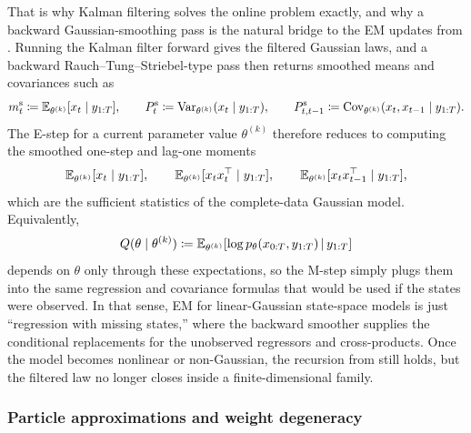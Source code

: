 That is why Kalman filtering solves the online problem exactly, and why a backward Gaussian-smoothing pass is the natural bridge to the EM updates from .
Running the Kalman filter forward gives the filtered Gaussian laws, and a backward Rauch--Tung--Striebel-type pass then returns smoothed means and covariances such as
\[
  m_t^{\mathrm{s}} \coloneqq \mathbb{E}_{\theta^{(k)}}[x_t\mid y_{1:T}],
  \qquad
  P_t^{\mathrm{s}} \coloneqq \operatorname{Var}_{\theta^{(k)}}(x_t\mid y_{1:T}),
  \qquad
  P_{t,t-1}^{\mathrm{s}} \coloneqq \operatorname{Cov}_{\theta^{(k)}}(x_t,x_{t-1}\mid y_{1:T}).
\]
The E-step for a current parameter value $\theta^{(k)}$ therefore reduces to computing the smoothed one-step and lag-one moments
\begin{equation}
  \mathbb{E}_{\theta^{(k)}}[x_t \mid y_{1:T}],
  \qquad
  \mathbb{E}_{\theta^{(k)}}[x_t x_t^\top \mid y_{1:T}],
  \qquad
  \mathbb{E}_{\theta^{(k)}}[x_t x_{t-1}^\top \mid y_{1:T}],
  \label{eq:smc-em-sufficient-statistics}
\end{equation}
which are the sufficient statistics of the complete-data Gaussian model.
Equivalently,
\[
  Q(\theta \mid \theta^{(k)})
  \coloneqq
  \mathbb{E}_{\theta^{(k)}}\!\left[
    \log p_\theta(x_{0:T},y_{1:T})
    \,\middle|\,
    y_{1:T}
  \right]
\]
depends on $\theta$ only through these expectations, so the M-step simply plugs them into the same regression and covariance formulas that would be used if the states were observed.
In that sense, EM for linear-Gaussian state-space models is just ``regression with missing states,'' where the backward smoother supplies the conditional replacements for the unobserved regressors and cross-products.
Once the model becomes nonlinear or non-Gaussian, the recursion from  still holds, but the filtered law no longer closes inside a finite-dimensional family.

\subsubsection{Particle approximations and weight degeneracy}
\label{subsubsec:smc-particles}

